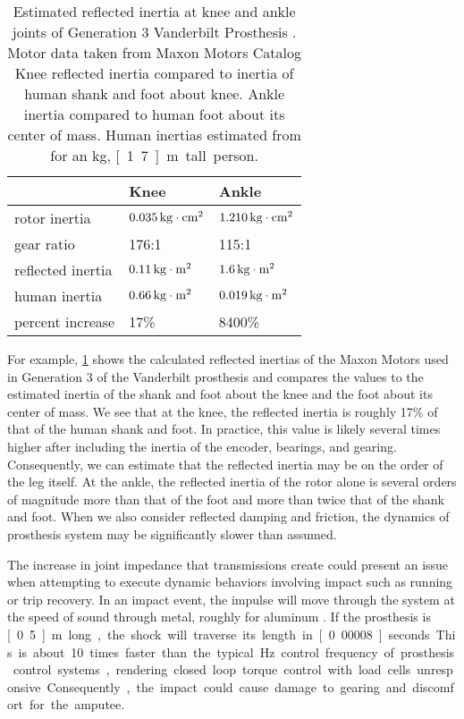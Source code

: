 \begin{table}
  \centering
  \begin{tabular}{lll}
    \toprule
    & Knee & Ankle \\
    \midrule
    rotor inertia & $\unit[0.035]{kg \cdot cm^2}$ 
        & $\unit[1.210]{kg \cdot cm^2}$\\
    gear ratio & 176:1 & 115:1 \\
    reflected inertia & $\unit[0.11]{kg \cdot m^2}$ & 
        $\unit[1.6]{kg \cdot m^2}$\\
    human inertia & $\unit[0.66]{kg \cdot m^2}$  & $\unit[0.019]{kg \cdot m^2}$\\
    percent increase & 17\% & 8400\% \\
    \bottomrule
  \end{tabular}
  \caption{Estimated reflected inertia at knee and ankle joints of Generation 3
  Vanderbilt Prosthesis \citep{lawson2014robotic}. Motor data taken from Maxon
  Motors Catalog\citep{maxon_flat_motor,
  maxon_ec4pole} Knee reflected inertia compared to inertia of human shank and
  foot about knee. Ankle inertia compared to human foot about its center of
  mass. Human inertias estimated from \citet{winter2009biomechanics} for an
  \unit[85]{kg}, \unit[1.7]{m} tall person.}
  \label{tab:vanderbilt_reflec_interita}
\end{table}

For example, \cref{tab:vanderbilt_reflec_interita} shows the calculated
reflected inertias of the Maxon Motors used in Generation 3 of the Vanderbilt
prosthesis and compares the values to the estimated inertia of the shank and
foot about the knee and the foot about its center of mass. We see that at the
knee, the reflected inertia is roughly 17\% of that of the human shank and foot.
In practice, this value is likely several times higher after including the
inertia of the encoder, bearings, and gearing. Consequently, we can estimate
that the reflected inertia may be on the order of the leg itself. At the ankle,
the reflected inertia of the rotor alone is several orders of magnitude more
than that of the foot and more than twice that of the shank and foot. When we
also consider reflected damping and friction, the dynamics of prosthesis system
may be significantly slower than assumed.

The increase in joint impedance that transmissions create could present an issue
when attempting to execute dynamic behaviors involving impact such as running or
trip recovery. In an impact event, the impulse will move through the system at
the speed of sound through metal, roughly  for aluminum
\citep{lide2004crc}. If the prosthesis is \unit[0.5]{m} long, the shock will
traverse its length in \unit[0.00008]{seconds}. This is about 10 times faster
than the typical \unit[1000]{Hz} control frequency of prosthesis control
systems, rendering closed loop torque control with load cells unresponsive.
Consequently, the impact could cause damage to gearing and discomfort for the
amputee.

